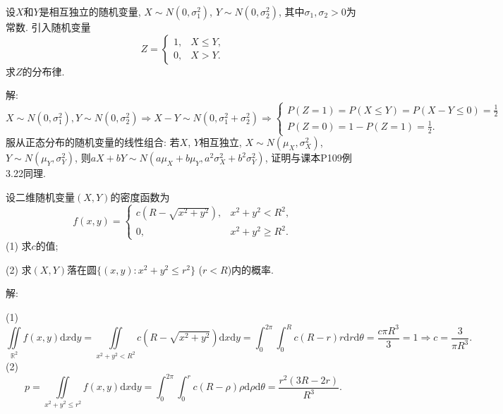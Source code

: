 \documentclass[standard]{ExBook}
\renewenvironment{shaded}{%
  \def\FrameCommand{\fboxsep=\FrameSep \colorbox{shadecolor}}%
  \MakeFramed{\advance\hsize-\width \FrameRestore}%
}{%
  \endMakeFramed
}
\begin{document}
\begin{qitems}
\vspace{2.5cm-5em}

    \begin{bbox}
    \begin{shaded}
        \qitem
设$X$和$Y$是相互独立的随机变量, $X\sim N(0,\sigma_{1}^{2})$, $Y\sim N(0,\sigma_{2}^{2})$, 其中$\sigma_{1},\sigma_{2}>0$为常数. 引入随机变量
$$
    Z=
    \left\{
    \begin{array}{ll}
        1, &X\leq Y,\\
        0, &X>Y.
    \end{array}
    \right.
$$
求$Z$的分布律.
    \end{shaded}
    \end{bbox}

\vspace{\dimexpr2.5cm-5em\relax}

解: 
$$
X\sim N(0,\sigma_{1}^{2}), Y\sim N(0,\sigma_{2}^{2}) \Longrightarrow X-Y\sim N(0,\sigma_{1}^{2}+\sigma_{2}^{2})
\Longrightarrow
\left\{
\begin{array}{l}
P(Z=1)=P(X\leq Y)=P(X-Y\leq 0)=\frac{1}{2}\\
P(Z=0)=1-P(Z=1)=\frac{1}{2}.
\end{array}
\right.
$$
\textcolor{themeColor}{\selectfont {} 服从正态分布的随机变量的线性组合: 若$X$, $Y$相互独立, $X\sim N(\mu_{X},\sigma_{X}^{2})$, $Y\sim N(\mu_{Y},\sigma_{Y}^{2})$, 则$aX+bY\sim N(a\mu_{X}+b\mu_{Y}, a^2 \sigma_{X}^{2}+b^2 \sigma_{Y}^{2})$, 证明与课本P109例3.22同理.}

\vspace{2.5cm-5em}

    \begin{bbox}
    \begin{shaded}
        \qitem
设二维随机变量$(X,Y)$的密度函数为
$$
    f(x,y)=
    \left\{
    \begin{array}{ll}
        c(R-\sqrt{x^2+y^2}), & x^2+y^2<R^2,\\
        0, & x^2+y^2\geq R^2.
    \end{array}
    \right.
$$
(1) 求$c$的值;

(2) 求$(X,Y)$落在圆$\{(x,y):x^2+y^2\leq r^2\}$ ($r<R$)内的概率.
    \end{shaded}
    \end{bbox}

\vspace{\dimexpr2.5cm-5em\relax}

解: 

(1)
$$\displaystyle\iint\limits_{\mathbb{R}^2}f(x,y)\mathrm{d}x\mathrm{d}y=\iint\limits_{x^2+y^2<R^2}c(R-\sqrt{x^2+y^2})\mathrm{d}x\mathrm{d}y=\int_{0}^{2\pi}\int_{0}^{R}c(R-r)r\mathrm{d}r\mathrm{d}\theta=\frac{c\pi R^3}{3}=1 \Longrightarrow c=\frac{3}{\pi R^3}.$$
(2)
$$p=\displaystyle\iint\limits_{x^2+y^2\leq r^2}f(x,y)\mathrm{d}x\mathrm{d}y=\int_{0}^{2\pi}\int_{0}^{r}c(R-\rho)\rho\mathrm{d}\rho\mathrm{d}\theta=\frac{r^2(3R-2r)}{R^3}.$$


\end{qitems}
\end{document}
